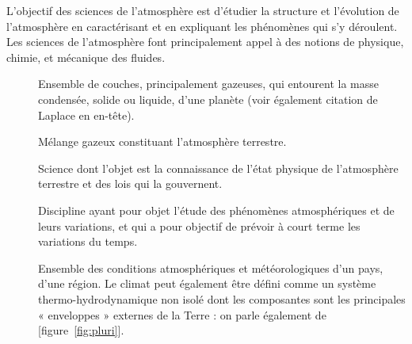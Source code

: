 \sk
L'objectif des sciences de l'atmosphère est d'étudier la structure et l'évolution de l'atmosphère en caractérisant et en expliquant les phénomènes qui s'y déroulent. Les sciences de l'atmosphère font principalement appel à des notions de physique, chimie, et mécanique des fluides.
\begin{description}
\item[] Ensemble de couches, principalement gazeuses, qui entourent la masse condensée, solide ou liquide, d'une planète (voir également citation de Laplace en en-tête).
\item[] Mélange gazeux constituant l'atmosphère terrestre.
\item[] Science dont l'objet est la connaissance de l'état physique de l'atmosphère terrestre et des lois qui la gouvernent.
\item[] Discipline ayant pour objet l'étude des phénomènes atmosphériques et de leurs variations, et qui a pour objectif de prévoir à court terme les variations du temps.
\item[] Ensemble des conditions atmosphériques et météorologiques d'un pays, d'une région. Le climat peut également être défini comme un système thermo-hydrodynamique non isolé dont les composantes sont les principales « enveloppes » externes de la Terre : on parle également de~ [figure~\ref{fig:pluri}]. 
\end{description}

